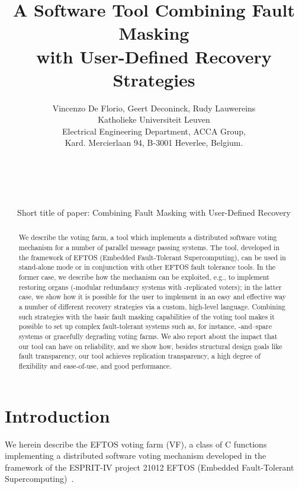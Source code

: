 \documentclass[11pt]{article}
\begin{document}
\title{A Software Tool Combining Fault Masking \\
with User-Defined Recovery Strategies}
\author{Vincenzo De Florio, Geert Deconinck, Rudy Lauwereins \\
Katholieke Universiteit Leuven\\
Electrical Engineering Department, ACCA Group,\\
Kard. Mercierlaan 94, B-3001 Heverlee, Belgium.\\
\\ \\ \\ \\ \\ 
Short title of paper: Combining Fault Masking with User-Defined Recovery}
\def\today{}
\maketitle
\vfill\eject
\begin{abstract}
We describe the voting farm, a tool which implements a distributed software
voting mechanism for a number of parallel message passing systems.
The tool, developed in the framework of EFTOS
(Embedded Fault-Tolerant Supercomputing), can be used in stand-alone mode or
in conjunction with other EFTOS fault tolerance tools.
In the former case, we describe how the mechanism can be exploited, e.g.,
to implement restoring organs (-modular redundancy systems with 
-replicated voters); in the latter case, we show how it is possible 
for the user to implement in an easy and effective way a number of
different recovery strategies via a custom, high-level language. Combining
such strategies with the basic fault
masking capabilities of the voting tool makes it possible to set up complex fault-tolerant
systems such as, for instance, -and--spare systems or gracefully degrading
voting farms. 
We also report about the impact that our tool can have on reliability, and
we show how,
besides structural design goals like
fault transparency, our tool achieves replication transparency, a high
degree of flexibility and ease-of-use, and good performance. 
\end{abstract}
\vfill\eject

\section{Introduction}
We herein describe the EFTOS voting farm (VF),
a class of C functions implementing a distributed software voting mechanism
developed in the framework of the ESPRIT-IV project 21012 EFTOS
(Embedded Fault-Tolerant Supercomputing)~\cite{DDLV97a,DVBD97}.
\end{document}
